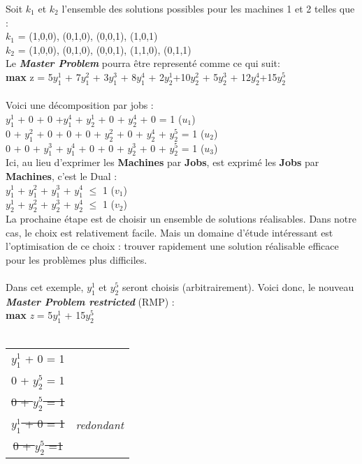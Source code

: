 Soit \textit{$k_1$} et \textit{$k_2$} l'ensemble des solutions possibles pour les machines 1 et 2 telles que :
\\
\textit{$k_1$} = { (1,0,0), (0,1,0), (0,0,1), (1,0,1)} \\
\textit{$k_2$} = {  (1,0,0), (0,1,0), (0,0,1), (1,1,0), (0,1,1)} \\ 

Le \textbf{\textit{Master Problem}} pourra être representé comme ce qui suit:
\\
\textbf{max} z = 5$y_1^1$ + 7$y_1^2$ + 3$y_1^3$ + 8$y_1^4$ + 2$y_2^1$+10$y_2^2$ + 5$y_2^3$ + 12$y_2^4$+15$y_2^5$
\\ \\
Voici une décomposition par jobs : \\
$y_1^1$ + 0 + 0 +$y_1^4$ + $y_2^1$  + 0 + $y_2^4$ + 0 = 1 (\textit{$u_1$}) \\
0 + $y_1^2$ + 0 + 0 + 0 + $y_2^2$ + 0 + $y_2^4$ + $y_2^5$ = 1 (\textit{$u_2$}) \\
0 + 0 + $y_1^3$ + $y_1^4$ + 0 + 0 + $y_2^3$ + 0 + $y_2^5$ = 1     (\textit{$u_3$}) \\

Ici, au lieu d'exprimer les \textbf{Machines} par \textbf{Jobs}, est exprimé les \textbf{Jobs} par \textbf{Machines}, c'est le Dual :\\
$y_1^1$ + $y_1^2$ + $y_1^3$ + $y_1^4$ $\leq$ 1 (\textit{$v_1$}) \\
$y_2^1$ + $y_2^2$ + $y_2^3$ + $y_2^4$ $\leq$ 1 (\textit{$v_2$}) \\

La prochaine étape est de choisir un ensemble de solutions réalisables. Dans notre cas, le choix est relativement facile. Mais un domaine d'étude intéressant est l'optimisation de ce choix : trouver rapidement une solution réalisable efficace pour les problèmes plus difficiles.
\\
\\
Dans cet exemple, $y_1^1$ et $y_2^5$ seront choisis (arbitrairement). Voici donc, le nouveau \textbf{\textit{Master Problem restricted}} (RMP) : \\
\textbf{max} \textit{z} = 5$y_1^1$  + 15$y_2^5$ 
\\ \\
\begin{tabular}{c c }
$y_1^1$  + 0 = 1 & \\
0 + $y_2^5$ = 1 & \\
\sout{0 + $y_2^5$ = 1} & \\
\sout{$y_1^1$  + 0 = 1} & \textit{redondant}\\
\sout{0 + $y_2^5$ =1} & \\ 
\end{tabular} 

